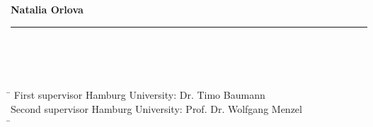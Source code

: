 \begin{titlepage}
	\noindent \textbf{Natalia Orlova} \\
	\noindent \rule{\textwidth}{0.4mm} 
	 \\
	 \\
	 \\
	\begin{tabbing}
	\hspace{20em} \=  \kill
	First supervisor Hamburg University: \> Dr. Timo Baumann \\
	Second supervisor Hamburg University: \> Prof. Dr. Wolfgang Menzel \\
		
	\hspace{20em} \=  \kill
	
			
	\end{tabbing}
	

\end{titlepage}

%
%